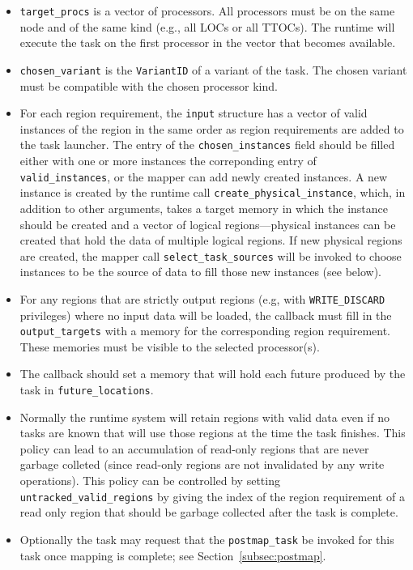 \begin{itemize}
\item {\tt target\_procs} is a vector of processors.  All processors must be on the same node and of the same kind (e.g., all LOCs or all TTOCs).  The runtime will execute the task on the first processor in the vector that becomes available.
\item {\tt chosen\_variant} is the {\tt VariantID} of a variant of the task.  The chosen variant must be compatible with the chosen processor kind.
\item For each region requirement, the {\tt input} structure has a vector of valid instances of the region in the same order
  as region requirements are added to the task launcher.  The entry of the {\tt chosen\_instances} field should be filled either  with one or more
  instances the correponding entry of {\tt valid\_instances}, or the mapper can add newly created instances.  A new instance is created by the runtime call
  {\tt create\_physical\_instance}, which, in addition to other arguments, takes a target memory in which the instance should be created and a vector of logical regions---physical instances can be created that hold the data of multiple logical regions.
  If new physical regions are created, the mapper call {\tt select\_task\_sources} will be invoked to choose instances to be the source of data to fill those new instances (see below).

\item For any regions that are strictly output regions (e.g, with {\tt WRITE\_DISCARD} privileges) where no input data will be loaded, the callback must fill in the {\tt output\_targets} with a memory for the corresponding
  region requirement.  These memories must be visible to the selected processor(s).
  
\item The callback should set a memory that will hold each future produced by the task in {\tt future\_locations}.

\item Normally the runtime system will retain regions with valid data even if no tasks are known that will use those regions at the time the task finishes.  This policy can lead to an accumulation of read-only regions that are never garbage colleted (since read-only regions
  are not invalidated by any write operations).  This policy can be controlled by setting {\tt untracked\_valid\_regions} by giving the index of the region requirement of a read only region that should be garbage collected after the task is complete.

\item Optionally the task may request that the {\tt postmap\_task} be invoked for this task once mapping is complete; see Section~\ref{subsec:postmap}.
\end{itemize}  


